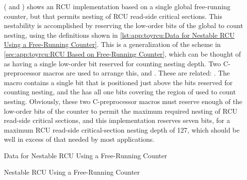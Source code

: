 ( and )
shows an RCU implementation based on a single global free-running counter,
but that permits nesting of RCU read-side critical sections.
This nestability is accomplished by reserving the low-order bits of the
global  to count nesting, using the definitions shown in
\cref{lst:app:toyrcu:Data for Nestable RCU Using a Free-Running Counter}.
This is a generalization of the scheme in
\cref{sec:app:toyrcu:RCU Based on Free-Running Counter},
which can be thought of as having a single low-order bit reserved
for counting nesting depth.
Two C-preprocessor macros are used to arrange this,
 and
.
These are related: .
The  macro contains a single bit that is
positioned just above the bits reserved for counting nesting,
and the  has all one bits covering the
region of  used to count nesting.
Obviously, these two C-preprocessor macros must reserve enough
of the low-order bits of the counter to permit the maximum required
nesting of RCU read-side critical sections, and this implementation
reserves seven bits, for a maximum RCU read-side critical-section
nesting depth of 127, which should be well in excess of that needed
by most applications.

\begin{listing}[tbp]

\caption{Data for Nestable RCU Using a Free-Running Counter}
\label{lst:app:toyrcu:Data for Nestable RCU Using a Free-Running Counter}
\end{listing}

\begin{listing}[tbp]
\vspace*{-11pt}
\caption{Nestable RCU Using a Free-Running Counter}
\label{lst:app:toyrcu:Nestable RCU Using a Free-Running Counter}
\end{listing}


